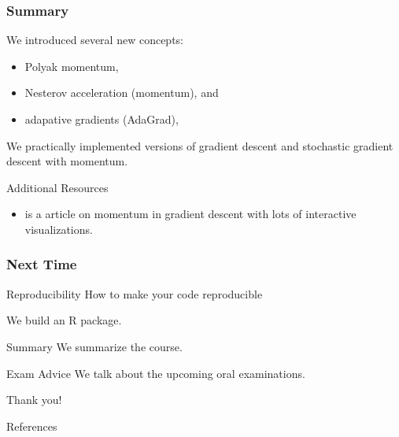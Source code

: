 \documentclass[aspectratio=1610,onlytextwidth]{beamer}
\begin{document}
\begin{frame}[c]
  \frametitle{Summary}

  We introduced several new concepts:
  \begin{itemize}
    \item Polyak momentum,
    \item Nesterov acceleration (momentum), and
    \item adapative gradients (AdaGrad),
  \end{itemize}

  \bigskip

  We practically implemented versions of gradient descent and stochastic gradient
  descent with momentum.

  \pause\bigskip

  \begin{block}{Additional Resources}
    \begin{itemize}
      \item \textcite{gohWhyMomentumReally2017} is a article on momentum
            in gradient descent with lots of interactive visualizations.
    \end{itemize}
  \end{block}
\end{frame}


\begin{frame}[c]
  \frametitle{Next Time}

  \begin{block}{Reproducibility}
    How to make your code reproducible

    \medskip

    We build an R package.
  \end{block}

  \pause

  \begin{block}{Summary}
    We summarize the course.
  \end{block}

  \pause

  \begin{block}{Exam Advice}
    We talk about the upcoming oral examinations.
  \end{block}

\end{frame}

\begin{frame}[standout]
  Thank you!
\end{frame}

\appendix

\begin{frame}[allowframebreaks]{References}
  \printbibliography[heading=none]
\end{frame}
\end{document}
